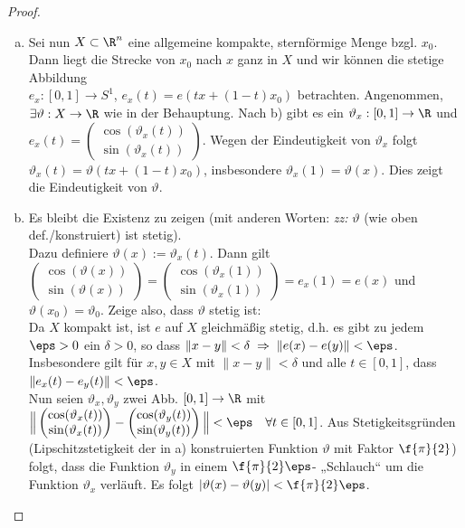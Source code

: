 \documentclass{mycourse}
\newcommand{\tta}{\vartheta}
\begin{document}
\begin{lem}[Hochhebungslemma]
\begin{proof}
\begin{enumerate}[a)]
	\item 
Sei nun $X \subset \R^n$ eine allgemeine kompakte, sternförmige Menge bzgl. $x_0$. \\  Dann liegt die Strecke von $x_0$ nach $x$ ganz in $X$ und wir können die stetige Abbildung \\ $e_x: [0,1] \to S^1$,  $ e_x(t) = e(tx + (1-t) x_0)$ betrachten. Angenommen, $\exists \tta: X \to \R$ wie in der Behauptung. Nach b) gibt es ein $\tta_x: [0,1] \to \R$ und $e_x(t) = \begin{pmatrix} \cos(\tta_x(t)) \\ \sin(\tta_x(t)) \end{pmatrix}$. Wegen der Eindeutigkeit von $\tta_x$ folgt  $\tta_x(t) = \tta(tx + (1-t) x_0)$, insbesondere $\tta_x(1) = \tta(x)$. Dies zeigt die Eindeutigkeit von $\tta$.

	\item 
Es bleibt die Existenz zu zeigen (mit anderen Worten: \emph{zz:} $\tta$ (wie oben def./konstruiert) ist stetig). \\
Dazu definiere $\tta(x) := \tta_x(t)$. Dann gilt $\begin{pmatrix} \cos(\tta(x)) \\ \sin(\tta(x)) \end{pmatrix} = \begin{pmatrix} \cos(\tta_x(1)) \\ \sin(\tta_x(1)) \end{pmatrix} = e_x(1) = e(x)$ und $\tta(x_0) = \tta_0$. Zeige also, dass $\tta$ stetig ist: \\
Da $X$ kompakt ist, ist $e$ auf $X$ gleichmäßig stetig, d.h. es gibt zu jedem $\eps > 0$ ein $\delta > 0$, so dass $\| x - y \| < \delta \; \Rightarrow \; \| e(x) - e(y) \| < \eps$. Insbesondere gilt für $x,y \in X$ mit $\| x - y \| < \delta$ und alle $t \in [0,1]$, dass $\| e_x(t) - e_y(t) \| < \eps$. \\
Nun seien $\tta_x,  \tta_y$ zwei Abb. $[0,1] \to \R$ mit $\Big \| \begin{pmatrix} \cos(\tta_x(t)) \\ \sin(\tta_x(t)) \end{pmatrix} - \begin{pmatrix} \cos(\tta_y(t)) \\ \sin(\tta_y(t)) \end{pmatrix} \Big \| < \eps \quad \forall t \in [0,1]$. Aus Stetigkeitsgründen (Lipschitzstetigkeit der in a) konstruierten Funktion $\tta$ mit Faktor $\f{\pi}{2}$) folgt, dass die Funktion $\tta_y$ in einem $\f{\pi}{2} \eps$- „Schlauch“ um die Funktion $\tta_x$ verläuft. Es folgt $|\tta(x) - \tta(y)| < \f{\pi}{2} \eps$.
\end{enumerate}
\end{proof}
\end{lem}
\end{document}
